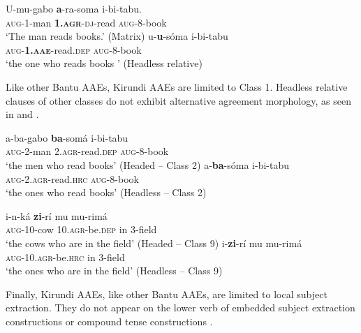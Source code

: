 \documentclass[output=paper,colorlinks,citecolor=brown
]{langscibook}
\begin{document}
\ea \label{ex:myers:comp}
\begin{xlist}
\ex \gll U-mu-gabo {\bfseries  a}-ra-soma i-bi-tabu.\\
			\textsc{aug}-1-man \textsc{{\bfseries  1.agr}-dj}-read  \textsc{aug}-8-book\\
			\glt `The man reads books.'  \hfill{(Matrix)}
		\ex	\gll	u-{\bfseries  u}-sóma i-bi-tabu \\ 
		\textsc{aug}-\textsc{{\bfseries  1.aae}}-read.\textsc{dep} \textsc{aug}-8-book\\
		\glt `the one who reads books '  \hfill{(Headless relative)}
		\end{xlist}
		\z
		
Like other Bantu AAEs, Kirundi AAEs are limited to Class 1. Headless relative clauses of other classes do not exhibit alternative agreement morphology, as seen in  and .

\ea \label{ex:myers:bagabo}
\begin{xlist}
\ex \gll  a-ba-gabo {\bfseries  ba}-somá i-bi-tabu\\
\textsc{aug}-2-man \textsc{2.agr}-read.\textsc{dep} \textsc{aug}-8-book\\
\glt `the men who read books' \hfill{(Headed -- Class 2)}
\ex \gll  a-{\bfseries  ba}-sóma i-bi-tabu \\
 \textsc{aug}-2.\textsc{agr}-read.\textsc{hrc} \textsc{aug}-8-book\\
\glt `the ones who read books' \hfill{(Headless -- Class 2)}
\end{xlist}
\z

\ea \label{ex:myers:class9}
\begin{xlist}
\ex \gll  i-n-ká {\bfseries  zi}-rí mu mu-rimá\\
\textsc{aug}-10-cow \textsc{10.agr}-be.\textsc{dep} in 3-field\\
\glt `the cows who are in the field' \hfill{(Headed -- Class 9)}
\ex \gll  i-{\bfseries  zi}-rí mu mu-rimá\\
\textsc{aug}-10.\textsc{agr}-be.\textsc{hrc} in 3-field\\
\glt `the ones who are in the field' \hfill{(Headless -- Class 9)}
\end{xlist}
\z

Finally, Kirundi AAEs, like other Bantu AAEs, are limited to local subject extraction. They do not appear on the lower verb of embedded subject extraction constructions  or compound tense constructions .
\end{document}

